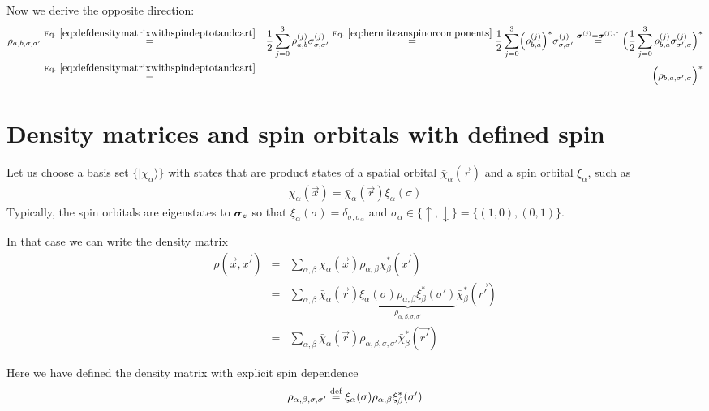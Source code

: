 \documentclass[11pt,a4paper]{report}
\begin{document}
Now we derive the opposite direction:
\begin{eqnarray}
\rho_{a,b,\sigma,\sigma'}
&\eqrel{eq:defdensitymatrixwithspindeptotandcart}{=}&
\frac{1}{2}\sum_{j=0}^3\rho^{(j)}_{a,b}\sigma^{(j)}_{\sigma,\sigma'}
\eqrel{eq:hermiteanspinorcomponents}{=}
\frac{1}{2}\sum_{j=0}^3\Bigl(\rho^{(j)}_{b,a}\Bigr)^*\sigma^{(j)}_{\sigma,\sigma'}
\stackrel{\mat{\sigma}^{(j)}=\mat{\sigma}^{(j),\dagger}}{=}
\Bigl(\frac{1}{2}\sum_{j=0}^3\rho^{(j)}_{b,a}\sigma^{(j)}_{\sigma',\sigma}\Bigr)^*
\nonumber\\
&\eqrel{eq:defdensitymatrixwithspindeptotandcart}{=}&
\Bigl(\rho_{b,a,\sigma',\sigma}\Bigr)^*
\end{eqnarray}


\section{Density matrices and spin orbitals with defined spin}
Let us choose a basis set $\{|\chi_\alpha\rangle\}$ with states that
are product states of a spatial orbital $\bar{\chi}_\alpha(\vec{r})$
and a spin orbital $\xi_\alpha$, such as
\begin{eqnarray}
\chi_\alpha(\vec{x})=\bar{\chi}_\alpha(\vec{r})\xi_\alpha(\sigma)
\label{eq:chiasproductofspaceandspin}
\end{eqnarray}
Typically, the spin orbitals are eigenstates to $\bm{\sigma}_z$ so
that $\xi_\alpha(\sigma)=\delta_{\sigma,\sigma_\alpha}$ and
$\sigma_\alpha\in\{\uparrow,\downarrow\}=\{(1,0),(0,1)\}$.

In that case we can write the density matrix
\begin{eqnarray}
\rho(\vec{x},\vec{x'})
&=&\sum_{\alpha,\beta}\chi_{\alpha}(\vec{x})\rho_{\alpha,\beta}\chi^*_{\beta}(\vec{x'})
\nonumber\\
&=&\sum_{\alpha,\beta}\bar{\chi}_{\alpha}(\vec{r})
\underbrace{\xi_\alpha(\sigma)\rho_{\alpha,\beta}\xi^*_\beta(\sigma')}
_{\rho_{\alpha,\beta,\sigma,\sigma'}}
\bar{\chi}^*_{\beta}(\vec{r'})
\nonumber\\
&=&\sum_{\alpha,\beta}\bar{\chi}_{\alpha}(\vec{r})\rho_{\alpha,\beta,\sigma,\sigma'}
\bar{\chi}^*_{\beta}(\vec{r'})
\label{eq:densitymatrixxxprimebyssigmaprime}
\end{eqnarray}

Here we have defined the density matrix with explicit spin dependence
\begin{eqnarray}
\rho_{\alpha,\beta,\sigma,\sigma'}\stackrel{\text{def}}{=}\xi_\alpha(\sigma)\rho_{\alpha,\beta}\xi^*_\beta(\sigma')
\label{eq:defdensitymatrixwithspindep}
\end{eqnarray}
\end{document}
